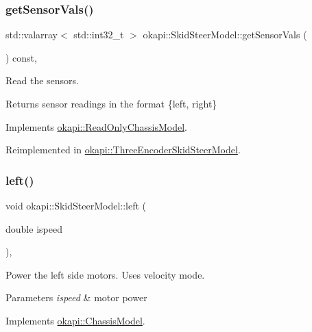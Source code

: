 \subsubsection{\texorpdfstring{getSensorVals()}{getSensorVals()}}
{\footnotesize\ttfamily std\+::valarray$<$ std\+::int32\+\_\+t $>$ okapi\+::\+Skid\+Steer\+Model\+::get\+Sensor\+Vals (\begin{DoxyParamCaption}{ }\end{DoxyParamCaption}) const\hspace{0.3cm}{\ttfamily [override]}, {\ttfamily [virtual]}}

Read the sensors.

\begin{DoxyReturn}{Returns}
sensor readings in the format \{left, right\} 
\end{DoxyReturn}


Implements \mbox{\hyperlink{classokapi_1_1ReadOnlyChassisModel_af2d844d9e12bb7c778ac9a5a0074f848}{okapi\+::\+Read\+Only\+Chassis\+Model}}.



Reimplemented in \mbox{\hyperlink{classokapi_1_1ThreeEncoderSkidSteerModel_a39af35aa25e5385584b3834911aed341}{okapi\+::\+Three\+Encoder\+Skid\+Steer\+Model}}.

\mbox{\label{classokapi_1_1SkidSteerModel_af2b00108853b82eb0fb5ecb3b71f413d}} 
\subsubsection{\texorpdfstring{left()}{left()}}
{\footnotesize\ttfamily void okapi\+::\+Skid\+Steer\+Model\+::left (\begin{DoxyParamCaption}\item[{double}]{ispeed }\end{DoxyParamCaption})\hspace{0.3cm}{\ttfamily [override]}, {\ttfamily [virtual]}}

Power the left side motors. Uses velocity mode.


\begin{DoxyParams}{Parameters}
{\em ispeed} & motor power \\
\hline
\end{DoxyParams}


Implements \mbox{\hyperlink{classokapi_1_1ChassisModel_aa2008856c169eb64c6648bc64c31c504}{okapi\+::\+Chassis\+Model}}.

